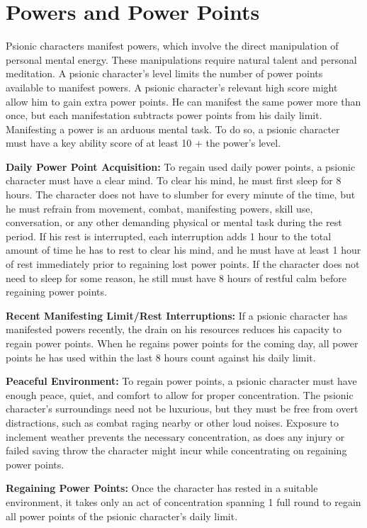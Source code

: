 \section{Powers and Power Points}
Psionic characters manifest powers, which involve the direct manipulation of personal mental energy. These manipulations require natural talent and personal meditation. A psionic character's level limits the number of power points available to manifest powers. A psionic character's relevant high score might allow him to gain extra power points. He can manifest the same power more than once, but each manifestation subtracts power points from his daily limit. Manifesting a power is an arduous mental task. To do so, a psionic character must have a key ability score of at least 10 + the power's level.

\textbf{Daily Power Point Acquisition:} To regain used daily power points, a psionic character must have a clear mind. To clear his mind, he must first sleep for 8 hours. The character does not have to slumber for every minute of the time, but he must refrain from movement, combat, manifesting powers, skill use, conversation, or any other demanding physical or mental task during the rest period. If his rest is interrupted, each interruption adds 1 hour to the total amount of time he has to rest to clear his mind, and he must have at least 1 hour of rest immediately prior to regaining lost power points. If the character does not need to sleep for some reason, he still must have 8 hours of restful calm before regaining power points.

\textbf{Recent Manifesting Limit/Rest Interruptions:} If a psionic character has manifested powers recently, the drain on his resources reduces his capacity to regain power points. When he regains power points for the coming day, all power points he has used within the last 8 hours count against his daily limit.

\textbf{Peaceful Environment:} To regain power points, a psionic character must have enough peace, quiet, and comfort to allow for proper concentration. The psionic character's surroundings need not be luxurious, but they must be free from overt distractions, such as combat raging nearby or other loud noises. Exposure to inclement weather prevents the necessary concentration, as does any injury or failed saving throw the character might incur while concentrating on regaining power points.

\textbf{Regaining Power Points:} Once the character has rested in a suitable environment, it takes only an act of concentration spanning 1 full round to regain all power points of the psionic character's daily limit.


